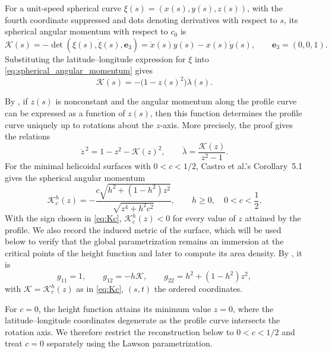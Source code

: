\documentclass[a4paper,11pt]{amsart}
\numberwithin{equation}{section}
\theoremstyle{plain}
\begin{document}
For a unit-speed spherical curve
$\xi(s)=(x(s),y(s),z(s))$, with the fourth coordinate suppressed and
dots denoting derivatives with respect to $s$, its spherical angular
momentum with respect to $c_0$ is \cite[Eq.~(3.2)]{Castro2024}
\begin{equation}\label{eq:spherical_angular_momentum}
\mathcal K(s)
=
-\det(\xi(s),\dot\xi(s),\mathbf e_3)
=
\dot x(s)y(s)-x(s)\dot y(s),
\qquad
\mathbf e_3=(0,0,1).
\end{equation}
Substituting the latitude--longitude expression for $\xi$ into
\eqref{eq:spherical_angular_momentum} gives
\begin{equation}\label{eq:angular_momentum_longitude}
\mathcal K(s)
=
-\bigl(1-z(s)^2\bigr)\dot\lambda(s).
\end{equation}

By \cite[Theorem~3.1]{Castro2024}, if $z(s)$ is nonconstant
and the angular momentum along the profile curve can be expressed as a function
of $z(s)$, then this function determines the profile curve uniquely up to
rotations about the $z$-axis. More precisely, the proof gives the relations
\begin{equation}\label{eq:Castro_reconstruction}
\dot z^{\,2}
=
1-z^2-\mathcal K(z)^2,
\qquad
\dot\lambda
=
\frac{\mathcal K(z)}{z^2-1}.
\end{equation}
For the minimal helicoidal surfaces with $0<c<1/2$,
Castro et al.'s Corollary~5.1 gives the spherical angular momentum
\begin{equation}\label{eq:Kc}
\mathcal K_c^h(z)
=
-\frac{c\sqrt{h^2+(1-h^2)z^2}}{\sqrt{z^4+h^2c^2}},
\qquad
h\geq0,\quad 0<c<\frac12.
\end{equation}
With the sign chosen in \eqref{eq:Kc},
$\mathcal K_c^h(z)<0$ for every value of $z$ attained by the profile.
We also record the induced metric of the surface, which will be used below to verify
that the global parametrization remains an immersion at the critical points
of the height function and later to compute its area density. By
\cite[Eqs.~(4.1) and~(4.3)]{Castro2024}, it is
\begin{equation}\label{eq:local_induced_metric}
    g_{11}=1,\qquad
    g_{12}=-h\mathcal K,\qquad
    g_{22}=h^2+(1-h^2)z^2,
\end{equation}
with $\mathcal K=\mathcal K_c^h(z)$ as in \eqref{eq:Kc}, $(s,t)$ the ordered coordinates.

For $c=0$, the height function attains its minimum value $z=0$, where
the latitude--longitude coordinates degenerate as the profile curve
intersects the rotation axis. We therefore restrict the reconstruction below
to $0<c<1/2$ and treat $c=0$ separately using the Lawson parametrization.
\end{document}

